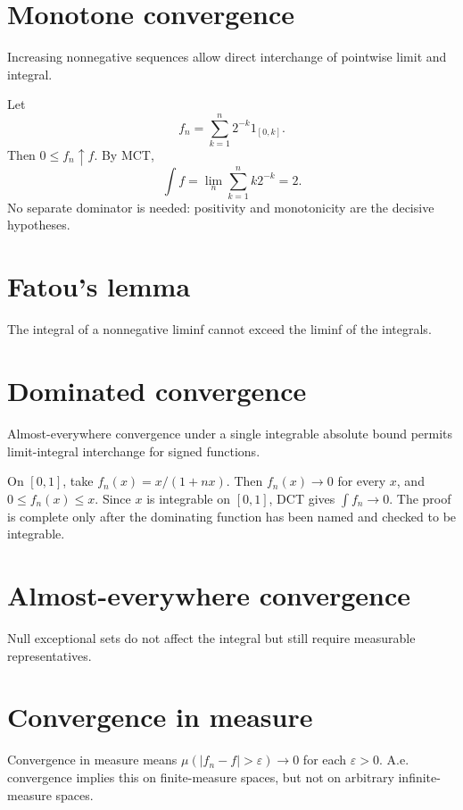 \section{Monotone convergence}
Increasing nonnegative sequences allow direct interchange of pointwise limit and integral.


\begin{example}\label{ex:iii04-expand-01}
Let
\[
f_n=\sum_{k=1}^n2^{-k}1_{[0,k]}.
\]
Then \(0\le f_n\uparrow f\). By MCT,
\[
\int f=\lim_n\sum_{k=1}^n k2^{-k}=2.
\]
No separate dominator is needed: positivity and monotonicity are the decisive
hypotheses.
\end{example}
\section{Fatou's lemma}
The integral of a nonnegative liminf cannot exceed the liminf of the integrals.

\section{Dominated convergence}
Almost-everywhere convergence under a single integrable absolute bound permits limit-integral interchange for signed functions.


\begin{example}\label{ex:iii04-expand-02}
On \([0,1]\), take \(f_n(x)=x/(1+nx)\). Then \(f_n(x)\to0\) for every \(x\),
and \(0\le f_n(x)\le x\). Since \(x\) is integrable on \([0,1]\), DCT gives
\(\int f_n\to0\). The proof is complete only after the dominating function has
been named and checked to be integrable.
\end{example}
\section{Almost-everywhere convergence}
Null exceptional sets do not affect the integral but still require measurable representatives.

\section{Convergence in measure}
Convergence in measure means $\mu(|f_n-f|>\varepsilon)\to0$ for each $\varepsilon>0$. A.e. convergence implies this on finite-measure spaces, but not on arbitrary infinite-measure spaces.

